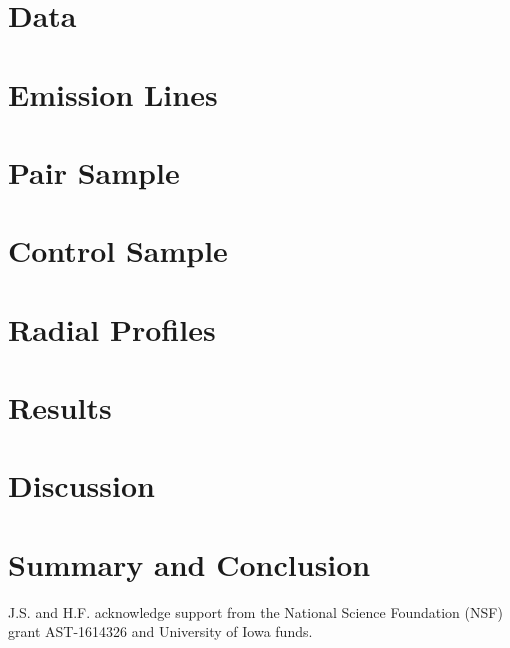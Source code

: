 \documentclass[iop,revtex4,twocolumn,apj,numberedappendix,appendixfloats]{emulateapj}
\begin{document}
\section{Data}\label{sec:data}


\section{Emission Lines}\label{sec:analysis}


\section{Pair Sample}\label{sec:pair}


\section{Control Sample}\label{sec:control}


\section{Radial Profiles}\label{sec:radial}


\section{Results}\label{sec:results}


\section{Discussion}\label{sec:discussion}


\section{Summary and Conclusion}\label{sec:sum}






\acknowledgments

J.S. and H.F. acknowledge support from the National Science Foundation (NSF) grant AST-1614326 and University of Iowa funds. 
\end{document}

